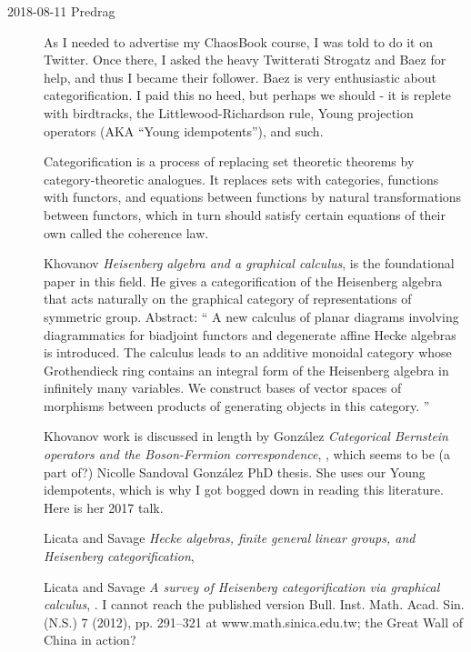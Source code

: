 \begin{description}

\item[2018-08-11 Predrag]
As I needed to advertise my
 {ChaosBook} course, I was
told to do it on Twitter. Once there, I asked the heavy Twitterati
Strogatz and  {Baez} for help,
and thus I became their follower. Baez is very enthusiastic about
categorification. I paid this no heed, but perhaps we should - it is
replete with birdtracks, the Littlewood-Richardson rule, Young projection
operators (AKA ``Young idempotents''), and such.

Categorification is a process of replacing set theoretic
theorems by category-theoretic analogues. It replaces sets with
categories, functions with functors, and equations between functions by
natural transformations between functors, which in turn should satisfy
certain equations of their own called the coherence law.

Khovanov {\em Heisenberg algebra and a graphical calculus},
 is the foundational paper in this field.
He gives a categorification of the Heisenberg algebra that acts naturally
on the graphical category of representations  of  symmetric  group.
Abstract: ``
A new calculus of planar diagrams involving diagrammatics for biadjoint
functors and degenerate affine Hecke algebras is introduced. The calculus
leads to an additive monoidal category whose Grothendieck ring contains
an integral form of the Heisenberg algebra in infinitely many variables.
We construct bases of vector spaces of morphisms between products of
generating objects in this category.
''

Khovanov work is discussed in length by
Gonz{\'a}lez {\em Categorical {Bernstein} operators and the
{Boson-Fermion} correspondence}, ,
which seems to be (a part of?)
{Nicolle Sandoval Gonz{\'a}lez} PhD thesis. She uses our Young idempotents,
which is why I got bogged down in reading this literature. Here is her
 {2017 talk}.

Licata and Savage {\em Hecke algebras, finite general linear
groups, and {Heisenberg } categorification}, 

Licata and Savage {\em A survey of {Heisenberg}
categorification via graphical calculus},
. I cannot reach the published version
Bull. Inst. Math. Acad. Sin. (N.S.) 7 (2012), pp. 291--321
at  {www.math.sinica.edu.tw};
the Great Wall of China in action?


\end{description}
